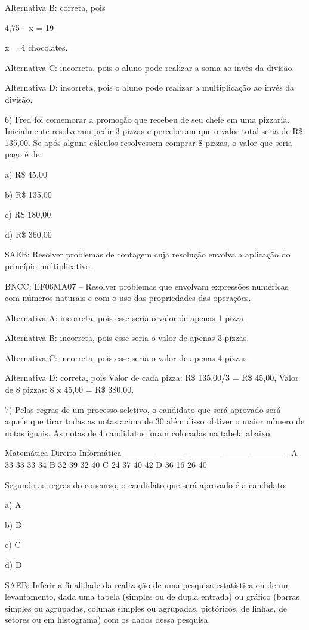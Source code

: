 Alternativa B: correta, pois

4,75· x = 19

x = 4 chocolates.

Alternativa C: incorreta, pois o aluno pode realizar a soma ao invés da
divisão.

Alternativa D: incorreta, pois o aluno pode realizar a multiplicação ao
invés da divisão.

6) Fred foi comemorar a promoção que recebeu de seu chefe em uma
pizzaria. Inicialmente resolveram pedir 3 pizzas e perceberam que o
valor total seria de R\$ 135,00. Se após alguns cálculos resolvessem
comprar 8 pizzas, o valor que seria pago é de:

a) R\$ 45,00

b) R\$ 135,00

c) R\$ 180,00

d) R\$ 360,00

SAEB: Resolver problemas de contagem cuja resolução envolva a aplicação
do princípio multiplicativo.

BNCC: EF06MA07 -- Resolver problemas que envolvam expressões numéricas
com números naturais e com o uso das propriedades das operações.

Alternativa A: incorreta, pois esse seria o valor de apenas 1 pizza.

Alternativa B: incorreta, pois esse seria o valor de apenas 3 pizzas.

Alternativa C: incorreta, pois esse seria o valor de apenas 4 pizzas.

Alternativa D: correta, pois Valor de cada pizza: R\$ 135,00/3 = R\$
45,00, Valor de 8 pizzas: 8 x 45,00 = R\$ 380,00.

7) Pelas regras de um processo seletivo, o candidato que será aprovado
será aquele que tirar todas as notas acima de 30 além disso obtiver o
maior número de notas iguais. As notas de 4 candidatos foram colocadas
na tabela abaixo:

Matemática Direito Informática ----------- ----------- ------------
--------- ------------- A 33 33 33 34 B 32 39 32 40 C 24 37 40 42 D 36
16 26 40

Segundo as regras do concurso, o candidato que será aprovado é a
candidato:

a) A

b) B

c) C

d) D

SAEB: Inferir a finalidade da realização de uma pesquisa estatística ou
de um levantamento, dada uma tabela (simples ou de dupla entrada) ou
gráfico (barras simples ou agrupadas, colunas simples ou agrupadas,
pictóricos, de linhas, de setores ou em histograma) com os dados dessa
pesquisa.

